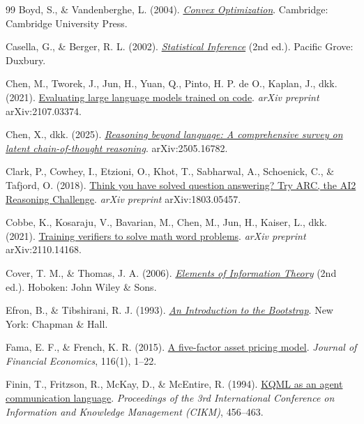 \begin{thebibliography}{99}
Boyd, S., \& Vandenberghe, L. (2004).
\href{https://web.stanford.edu/~boyd/cvxbook/bv_cvxbook.pdf}{\emph{Convex
Optimization}}. Cambridge: Cambridge University Press.

Casella, G., \& Berger, R. L. (2002).
\href{https://archive.org/details/statisticalinfer0000case}{\emph{Statistical
Inference}} (2nd ed.). Pacific Grove: Duxbury.

Chen, M., Tworek, J., Jun, H., Yuan, Q., Pinto, H. P. de O., Kaplan, J., dkk.
(2021). \href{https://arxiv.org/abs/2107.03374}{Evaluating large language
models trained on code}. \emph{arXiv preprint} arXiv:2107.03374.

Chen, X., dkk. (2025).
\href{https://arxiv.org/abs/2505.16782}{\emph{Reasoning beyond language: A
comprehensive survey on latent chain-of-thought reasoning}}. arXiv:2505.16782.

Clark, P., Cowhey, I., Etzioni, O., Khot, T., Sabharwal, A., Schoenick, C., \&
Tafjord, O. (2018). \href{https://arxiv.org/abs/1803.05457}{Think you have
solved question answering? Try ARC, the AI2 Reasoning Challenge}.
\emph{arXiv preprint} arXiv:1803.05457.

Cobbe, K., Kosaraju, V., Bavarian, M., Chen, M., Jun, H., Kaiser, L., dkk.
(2021). \href{https://arxiv.org/abs/2110.14168}{Training verifiers to solve
math word problems}. \emph{arXiv preprint} arXiv:2110.14168.

Cover, T. M., \& Thomas, J. A. (2006).
\href{https://github.com/Bladefidz/information-theory/blob/master/books/Elements%20of%20Information%20Theory.pdf}{\emph{Elements
of Information Theory}} (2nd ed.). Hoboken: John Wiley \& Sons.

Efron, B., \& Tibshirani, R. J. (1993).
\href{https://archive.org/details/introductiontobo0000efro}{\emph{An Introduction
to the Bootstrap}}. New York: Chapman \& Hall.

Fama, E. F., \& French, K. R. (2015).
\href{https://doi.org/10.1016/j.jfineco.2014.10.010}{A five-factor asset pricing
model}. \emph{Journal of Financial Economics}, 116(1), 1--22.

Finin, T., Fritzson, R., McKay, D., \& McEntire, R. (1994).
\href{https://doi.org/10.1145/191246.191322}{KQML as an agent communication
language}. \emph{Proceedings of the 3rd International Conference on Information
and Knowledge Management (CIKM)}, 456--463.


\end{thebibliography}
